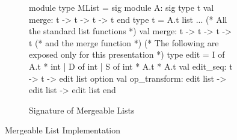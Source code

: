 \begin{figure}

\begin{subfigure}[b]{0.7\textwidth}
\begin{ocaml}
module type MList = sig
  module A: sig
    type t
    val merge: t -> t -> t -> t
  end
  type t = A.t list
  ... (* All the standard list functions *)
  val merge: t -> t -> t -> t (* and the merge function *)
  (* The following are exposed only for this presentation *)
  type edit = I of A.t * int
    | D of int
    | S of int * A.t * A.t
  val edit_seq: t -> t -> edit list option
  val op_transform: edit list -> edit list -> edit list
end
\end{ocaml}
\caption{Signature of Mergeable Lists}
\label{fig:mlist-sig}
\end{subfigure}


\caption{Mergeable List Implementation}
\label{fig:mlist}
\end{figure}
